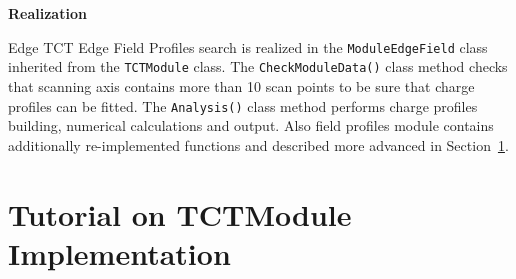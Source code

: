 \documentclass[12pt,oneside,notitlepage,abstracton,a4paper]{scrartcl}
\begin{document}
\textbf{Realization}

\indent Edge TCT Edge Field Profiles search is realized in the \lstinline$ModuleEdgeField$ class inherited from the \lstinline$TCTModule$ class. The \lstinline$CheckModuleData()$ class method checks that scanning axis contains more than 10 scan points to be sure that charge profiles can be fitted. The \lstinline$Analysis()$ class method performs charge profiles building, numerical calculations and output. Also field profiles module contains additionally re-implemented functions and described more advanced in Section~\ref{tutorial_impl}.

\section{Tutorial on TCTModule Implementation}\label{tutorial_impl}
\end{document}
